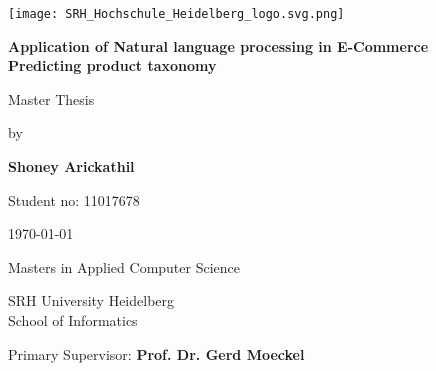 \begin{titlepage}

    \vspace*{3\baselineskip}
        \begin{flushright}        
  
                \texttt{[image: SRH\_Hochschule\_Heidelberg\_logo.svg.png]}
           
        \end{flushright}
    \vspace*{3\baselineskip}

    \centering
   


    {\Large \bfseries Application of Natural language processing in E-Commerce \\ Predicting product taxonomy}
    \vspace*{3\baselineskip}

    {\Large Master Thesis}
    \vspace*{1\baselineskip}

    {\Large by }
    \vspace*{2\baselineskip}

    {\Large  \bfseries Shoney Arickathil }
    \vspace*{0.5\baselineskip}

    {\Large  Student no: 11017678 }
    \vspace*{2\baselineskip}

    {\Large \today}
    \vspace*{8\baselineskip}


    {\Large  Masters in Applied Computer Science }
    \vspace*{0.5\baselineskip}

    {\Large  SRH University Heidelberg \\ School of Informatics}  
    \vspace*{6\baselineskip}

    \begin{minipage}{\textwidth}
        \begin{flushleft} %
            \large Primary Supervisor: \hfill \bfseries Prof. Dr. Gerd Moeckel
           
        \end{flushleft}
       
       
    \end{minipage}

    


   
    
\end{titlepage}